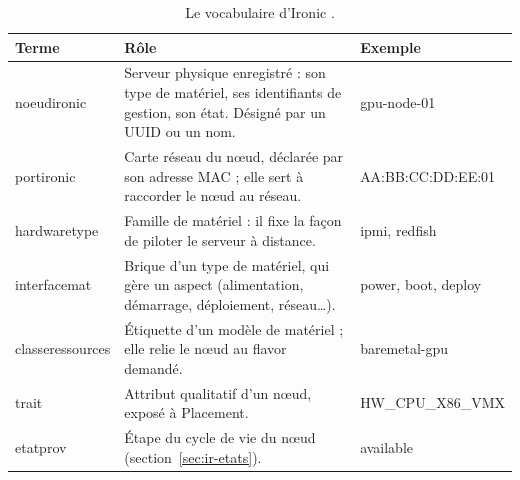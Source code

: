 \begin{table}[!ht]
\centering
\renewcommand{\arraystretch}{1.3}
\begin{tabular}{@{}>{\raggedright\arraybackslash}p{3.2cm}>{\raggedright\arraybackslash}p{8.2cm}>{\raggedright\arraybackslash\ttfamily\small}p{4.1cm}@{}}
\toprule
\textbf{Terme} & \textbf{Rôle} & \textrm{\textbf{Exemple}} \\
\midrule
\Gls{noeudironic} & Serveur physique enregistré : son type de matériel, ses identifiants de gestion, son état. Désigné par un UUID ou un nom. & gpu-node-01 \\
\Gls{portironic} & Carte réseau du nœud, déclarée par son adresse MAC ; elle sert à raccorder le nœud au réseau. & AA:BB:CC:DD:EE:01 \\
\Gls{hardwaretype} & Famille de matériel : il fixe la façon de piloter le serveur à distance. & ipmi, redfish \\
\Gls{interfacemat} & Brique d'un type de matériel, qui gère un aspect (alimentation, démarrage, déploiement, réseau\dots). & power, boot, deploy \\
\Gls{classeressources} & Étiquette d'un modèle de matériel ; elle relie le nœud au flavor demandé. & baremetal-gpu \\
\Gls{trait} & Attribut qualitatif d'un nœud, exposé à Placement. & HW\_CPU\_X86\_VMX \\
\Gls{etatprov} & Étape du cycle de vie du nœud (section~\ref{sec:ir-etats}). & available \\
\bottomrule
\end{tabular}
\caption{Le vocabulaire d'Ironic \parencite{ironic-enrollment,ironic-drivers}.}
\label{tab:ir-objets}
\end{table}

